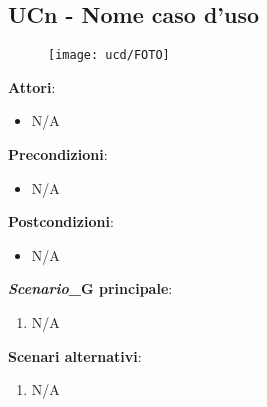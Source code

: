 \subsection{UCn - Nome caso d'uso}\label{usecase:n}
\begin{figure}[H]
    \centering
    \texttt{[image: ucd/FOTO]}
\end{figure}
\textbf{Attori}:
\begin{itemize}
    \item N/A
\end{itemize}
\textbf{Precondizioni}:
\begin{itemize}
    \item N/A
\end{itemize}
\textbf{Postcondizioni}:
\begin{itemize}
    \item N/A
\end{itemize}
\textbf{\textit{Scenario}_G principale}:
\begin{enumerate}
    \item N/A
\end{enumerate}
\textbf{Scenari alternativi}: %
\begin{enumerate}
    \item N/A
\end{enumerate}
\newpage

